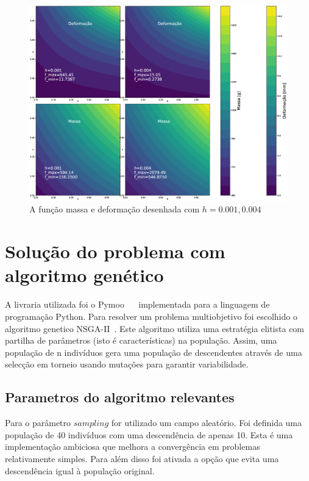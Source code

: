 \documentclass[a4paper,12pt]{article}
\begin{document}
\begin{figure}[h]
\begin{center}
\includegraphics[scale=0.3]{deformacaoEmassa.eps}
\end{center}
\caption{A função massa e deformação desenhada com $h= 0.001, 0.004$}
\label{fig:defIm1}
\end{figure}

\section{Solução do problema com algoritmo genético}

A livraria utilizada foi o Pymoo~\cite{Pymoo} ~\cite{PymooArt} implementada para a linguagem de programação Python. Para resolver um problema multiobjetivo foi escolhido o algoritmo genetico NSGA-II~\cite{NSGA}. Este algoritmo utiliza uma estratégia elitista com partilha de parâmetros (isto é características) na população. Assim, uma população de n indivíduos gera uma população de descendentes através de uma selecção em torneio usando mutações para garantir variabilidade.

\subsection{Parametros do algoritmo relevantes}

Para o parâmetro $sampling$ for utilizado um campo aleatório. Foi definida uma população de 40 indivíduos com uma descendência de apenas 10. Esta é uma implementação ambiciosa que melhora a convergência em problemas relativamente simples. Para além disso foi ativada a opção que evita uma descendência igual à população original.
\end{document}
